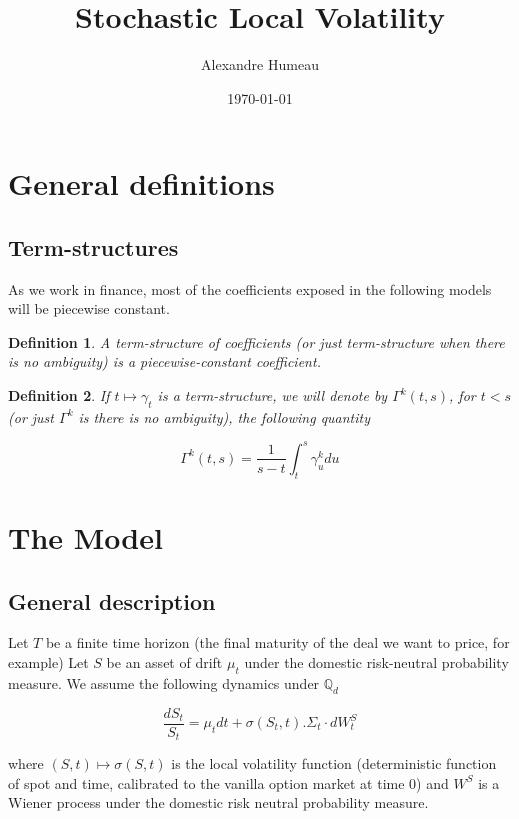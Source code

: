 \documentclass{article}
\newtheorem{definition}{Definition}[section]
\begin{document}
\title{Stochastic Local Volatility}
\author{Alexandre Humeau}
\date{\today}
\maketitle

\section{General definitions}
\subsection{Term-structures}

As we work in finance, most of the coefficients exposed in the following models will be piecewise constant.

\begin{definition}
	A term-structure of coefficients (or just term-structure when there is no ambiguity) is a piecewise-constant coefficient.
\end{definition}

\begin{definition}
	If $t \mapsto \gamma_t$ is a term-structure, we will denote by $\Gamma^k(t,s)$, for $t<s$ (or just $\Gamma^k$ is there is no ambiguity), the following quantity

\begin{equation}
	\Gamma^k(t,s) = \frac{1}{s-t} \int_t^s \gamma^k_u du
\end{equation}
\end{definition}

\section{The Model}
\subsection{General description}
Let $T$ be a finite time horizon (the final maturity of the deal we want to price, for example)
Let $S$ be an asset of drift $\mu_t$ under the domestic risk-neutral probability measure. We assume the following dynamics under $\mathbb{Q}_d$

\begin{equation}
	\frac{dS_t}{S_t} = \mu_t dt + \sigma(S_t,t). \Sigma_t \cdot dW_t^S
\end{equation}

\noindent where $(S,t) \mapsto \sigma(S,t)$ is the local volatility function (deterministic function of spot and time, calibrated to the vanilla option market at time $0$) and $W^S$ is a Wiener process under the domestic risk neutral probability measure. \\
\end{document}
